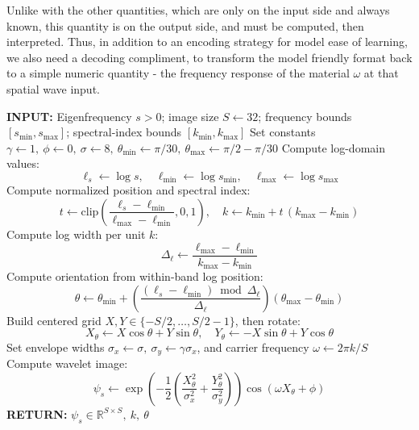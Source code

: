 \documentclass[preprint,review,12pt]{elsarticle}
\begin{document}
Unlike with the other quantities, which are only on the input side and always known, this quantity is on the output side, and must be computed, then interpreted. Thus, in addition to an encoding strategy for model ease of learning, we also need a decoding compliment, to transform the model friendly format back to a simple numeric quantity - the frequency response of the material $\omega$ at that spatial wave input.
\begin{algorithm}[H]
\caption{Eigenfrequency Wavelet Encoding}
\label{alg:eigenfrequency_wavelet_encoding}
\begin{algorithmic}[1]
\STATE \textbf{INPUT:} Eigenfrequency \( s>0 \); image size \( S \leftarrow 32 \); frequency bounds \( [s_{\min}, s_{\max}] \); spectral-index bounds \( [k_{\min}, k_{\max}] \)
\STATE Set constants \( \gamma \leftarrow 1,\ \phi \leftarrow 0,\ \sigma \leftarrow 8,\ \theta_{\min}\leftarrow \pi/30,\ \theta_{\max}\leftarrow \pi/2-\pi/30 \)
\STATE Compute log-domain values:
\[
\ell_s \leftarrow \log s,\quad \ell_{\min}\leftarrow \log s_{\min},\quad \ell_{\max}\leftarrow \log s_{\max}
\]
\STATE Compute normalized position and spectral index:
\[
t \leftarrow \mathrm{clip}\!\left(\frac{\ell_s-\ell_{\min}}{\ell_{\max}-\ell_{\min}},0,1\right),\quad
k \leftarrow k_{\min} + t\,(k_{\max}-k_{\min})
\]
\STATE Compute log width per unit \(k\):
\[
\Delta_\ell \leftarrow \frac{\ell_{\max}-\ell_{\min}}{k_{\max}-k_{\min}}
\]
\STATE Compute orientation from within-band log position:
\[
\theta \leftarrow \theta_{\min} + \left(\frac{(\ell_s-\ell_{\min})\bmod \Delta_\ell}{\Delta_\ell}\right)\left(\theta_{\max}-\theta_{\min}\right)
\]
\STATE Build centered grid \(X,Y \in \{-S/2,\dots,S/2-1\}\), then rotate:
\[
X_\theta \leftarrow X\cos\theta + Y\sin\theta,\quad
Y_\theta \leftarrow -X\sin\theta + Y\cos\theta
\]
\STATE Set envelope widths \( \sigma_x \leftarrow \sigma,\ \sigma_y \leftarrow \gamma \sigma_x \), and carrier frequency \( \omega \leftarrow 2\pi k/S \)
\STATE Compute wavelet image:
\[
\psi_s \leftarrow
\exp\!\left(-\frac{1}{2}\left(\frac{X_\theta^2}{\sigma_x^2}+\frac{Y_\theta^2}{\sigma_y^2}\right)\right)\cos(\omega X_\theta+\phi)
\]
\STATE \textbf{RETURN:} \( \psi_s \in \mathbb{R}^{S\times S},\ k,\ \theta \)
\end{algorithmic}
\end{algorithm}
\end{document}
